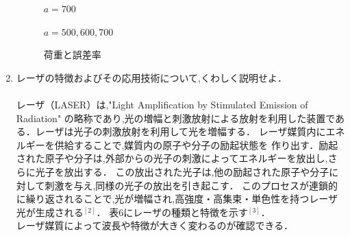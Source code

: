 \documentclass[a4paper,11pt]{jsarticle}
\begin{document}
\begin{enumerate}
\begin{figure}[h]
          \caption{$a = 700$}
        \end{figure}
        \clearpage
        \begin{figure}[h]
          \centering
          \caption{$a = 500,600,700$}
        \end{figure}
        \clearpage
        \begin{figure}[h]
          \centering
          \caption{荷重と誤差率}
        \end{figure}
        \clearpage
  \item レーザの特徴およびその応用技術について,くわしく説明せよ．\\
        \\
        \quad レーザ（LASER）は,"Light Amplification by Stimulated Emission of Radiation"
        の略称であり,光の増幅と刺激放射による放射を利用した装置である．レーザは光子の刺激放射を利用して光を増幅する．
        レーザ媒質内にエネルギーを供給することで,媒質内の原子や分子の励起状態を
        作り出す．励起された原子や分子は,外部からの光子の刺激によってエネルギーを放出し,さらに光子を放出する．
        この放出された光子は,他の励起された原子や分子に対して刺激を与え,同様の光子の放出を引き起こす．
        このプロセスが連鎖的に繰り返されることで,光が増幅され,高強度・高集束・単色性を持つレーザ光が生成される$^{[2]}$．
        表6にレーザの種類と特徴を示す$^{[3]}$．\\レーザ媒質によって波長や特徴が大きく変わるのが確認できる．



\end{enumerate}
\end{document}
